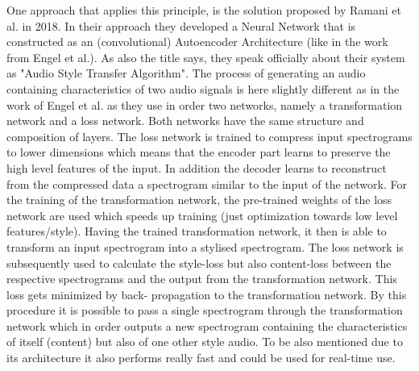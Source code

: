 One approach that applies this principle, is the solution proposed by Ramani et al. in 2018. \cite{Ramani2018} In their approach they developed a Neural Network that is constructed as an (convolutional) Autoencoder Architecture (like in the work from Engel et al.). As also the title says, they speak officially about their system as "Audio Style Transfer Algorithm". The process of generating an audio containing characteristics of two audio signals is here slightly different as in the work of Engel et al. as they use in order two networks, namely a transformation network and a loss network. Both networks have the same structure and composition of layers. The loss network is trained to compress input spectrograms to lower dimensions which means that the encoder part learns to preserve the high level features of the input. In addition the decoder learns to reconstruct from the compressed data a spectrogram similar to the input of the network. For the training of the transformation network, the pre-trained weights of the loss network are used which speeds up training (just optimization towards low level features/style). Having the trained transformation network, it then is able to transform an input spectrogram into a stylised spectrogram. The loss network is subsequently used to calculate the style-loss but also content-loss between the respective spectrograms and the output from the transformation network. This loss gets minimized by back- propagation to the transformation network. By this procedure it is possible to pass a single spectrogram through the transformation network which in order outputs a new spectrogram containing the characteristics of itself (content) but also of one other style audio. To be also mentioned due to its architecture it also performs really fast and could be used for real-time use.\\


